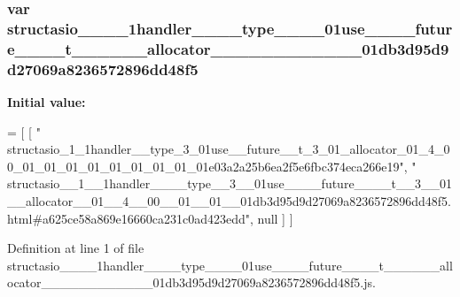 \subsubsection[{structasio\+\_\+\+\_\+1\+\_\+\+\_\+1handler\+\_\+\+\_\+\+\_\+\+\_\+type\+\_\+\+\_\+3\+\_\+\+\_\+01use\+\_\+\+\_\+\+\_\+\+\_\+future\+\_\+\+\_\+\+\_\+\+\_\+t\+\_\+\+\_\+3\+\_\+\+\_\+01\+\_\+\+\_\+allocator\+\_\+\+\_\+01\+\_\+\+\_\+4\+\_\+\+\_\+00\+\_\+\+\_\+01\+\_\+\+\_\+01\+\_\+\+\_\+01db3d95d9d27069a8236572896dd48f5}]{\setlength{\rightskip}{0pt plus 5cm}var structasio\+\_\+\+\_\+\_\+\+\_\+1handler\+\_\+\+\_\+\+\_\+\+\_\+type\+\_\+\+\_\+\_\+\+\_\+01use\+\_\+\+\_\+\+\_\+\+\_\+future\+\_\+\+\_\+\+\_\+\+\_\+t\+\_\+\+\_\+\_\+\+\_\+\_\+\+\_\+allocator\+\_\+\+\_\+\_\+\+\_\+\_\+\+\_\+\_\+\+\_\+\_\+\+\_\+\_\+\+\_\+01db3d95d9d27069a8236572896dd48f5}\label{structasio____1____1handler________type____3____01use________future________t____3____01____alloce316d6dfae67d238344152715dcbff51_abc9fdee8351ae4acff99d5f22607601f}
{\bfseries Initial value\+:}
\begin{DoxyCode}
=
[
    [ \textcolor{stringliteral}{"
      structasio\_1\_1handler\_\_type\_3\_01use\_\_future\_\_t\_3\_01\_allocator\_01\_4\_00\_01\_01\_01\_01\_01\_01\_01\_01\_01e03a2a25b6ea2f5e6fbc374eca266e19"}, \textcolor{stringliteral}{"
      structasio\_\_1\_\_1handler\_\_\_\_type\_\_3\_\_01use\_\_\_\_future\_\_\_\_t\_\_3\_\_01\_\_allocator\_\_01\_\_4\_\_00\_\_01\_\_01\_\_01db3d95d9d27069a8236572896dd48f5.html#a625ce58a869e16660ca231c0ad423edd"}, null ]
]
\end{DoxyCode}


Definition at line 1 of file structasio\+\_\+\+\_\+\_\+\+\_\+1handler\+\_\+\+\_\+\+\_\+\+\_\+type\+\_\+\+\_\+\_\+\+\_\+01use\+\_\+\+\_\+\+\_\+\+\_\+future\+\_\+\+\_\+\+\_\+\+\_\+t\+\_\+\+\_\+\_\+\+\_\+\_\+\+\_\+allocator\+\_\+\+\_\+\_\+\+\_\+\_\+\+\_\+\_\+\+\_\+\_\+\+\_\+\_\+\+\_\+01db3d95d9d27069a8236572896dd48f5.\+js.

